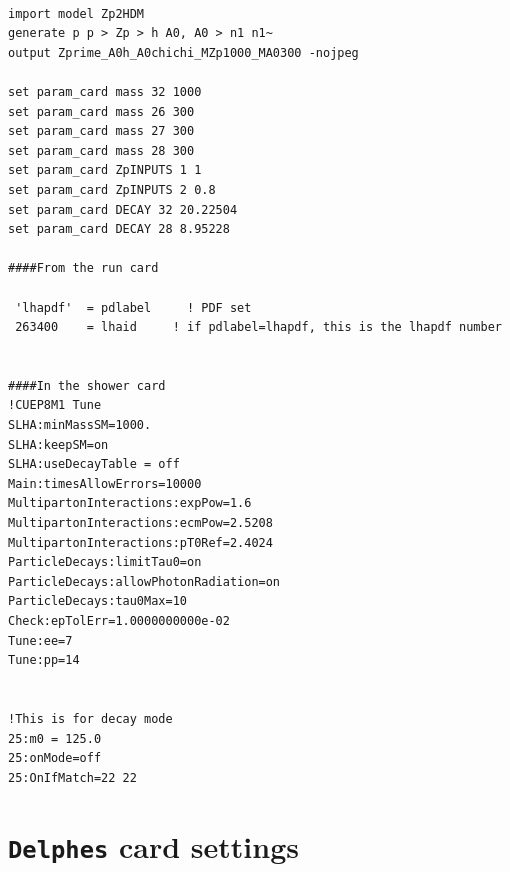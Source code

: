 \documentclass[12pt,A4paper]{article}
\begin{document}
\lstset{language=sh}
\begin{lstlisting}

import model Zp2HDM
generate p p > Zp > h A0, A0 > n1 n1~
output Zprime_A0h_A0chichi_MZp1000_MA0300 -nojpeg

set param_card mass 32 1000
set param_card mass 26 300
set param_card mass 27 300
set param_card mass 28 300
set param_card ZpINPUTS 1 1
set param_card ZpINPUTS 2 0.8
set param_card DECAY 32 20.22504
set param_card DECAY 28 8.95228

####From the run card

 'lhapdf'  = pdlabel     ! PDF set                                     
 263400    = lhaid     ! if pdlabel=lhapdf, this is the lhapdf number
	
	
####In the shower card
!CUEP8M1 Tune
SLHA:minMassSM=1000.
SLHA:keepSM=on
SLHA:useDecayTable = off
Main:timesAllowErrors=10000
MultipartonInteractions:expPow=1.6
MultipartonInteractions:ecmPow=2.5208
MultipartonInteractions:pT0Ref=2.4024
ParticleDecays:limitTau0=on
ParticleDecays:allowPhotonRadiation=on
ParticleDecays:tau0Max=10
Check:epTolErr=1.0000000000e-02
Tune:ee=7
Tune:pp=14


!This is for decay mode
25:m0 = 125.0
25:onMode=off
25:OnIfMatch=22 22
\end{lstlisting}

\section{\texttt{Delphes} card settings}\label{appDelphes}
\end{document}
